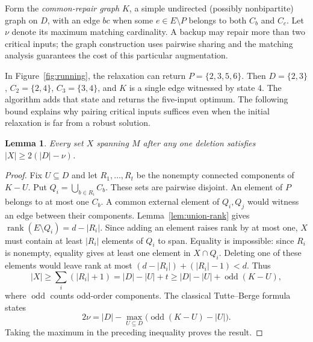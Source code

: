 \documentclass[11pt]{article}
\newtheorem{lemma}[theorem]{Lemma}
\theoremstyle{definition}
\theoremstyle{remark}\newtheorem{remark}[theorem]{Remark}
\DeclareMathOperator{\rk}{rank}
\begin{document}
Form the \emph{common-repair graph} $K$, a simple undirected
(possibly nonbipartite) graph on $D$, with an edge $bc$ when some
$e\in E\setminus P$ belongs to both $C_b$ and $C_c$.
Let $\nu$ denote its maximum matching cardinality. A backup may
repair more than two critical inputs; the graph construction uses
pairwise sharing and the matching analysis guarantees the cost of
this particular augmentation.

In Figure~\ref{fig:running}, the relaxation can return
$P=\{2,3,5,6\}$. Then $D=\{2,3\}$, $C_2=\{2,4\}$,
$C_3=\{3,4\}$, and $K$ is a single edge witnessed by state 4.
The algorithm adds that state and returns the five-input optimum.
The following bound explains why pairing critical inputs suffices
even when the initial relaxation is far from a robust solution.

\begin{lemma}\label{lem:packing}
Every set $X$ spanning $M$ after any one deletion satisfies
$|X|\ge2(|D|-\nu)$.
\end{lemma}
\begin{proof}
Fix $U\subseteq D$ and let $R_1,\ldots,R_t$ be the nonempty connected
components of $K-U$. Put $Q_i=\bigcup_{b\in R_i}C_b$. These sets are
pairwise disjoint. An element of $P$ belongs to at most one $C_b$. A common
external element of $Q_i,Q_j$ would witness an edge between their components.
Lemma~\ref{lem:union-rank} gives $\rk(E\setminus Q_i)=d-|R_i|$.
Since adding an element raises rank by at most one, $X$ must contain at
least $|R_i|$ elements of $Q_i$ to span. Equality is impossible: since $R_i$ is nonempty, equality gives at
least one element in $X\cap Q_i$. Deleting one of these elements would leave rank at most
$(d-|R_i|)+(|R_i|-1)<d$. Thus
\[
 |X|\ge\sum_i(|R_i|+1)=|D|-|U|+t
 \ge |D|-|U|+\operatorname{odd}(K-U),
\]
where $\operatorname{odd}$ counts odd-order components. The classical
Tutte--Berge formula~\cite{LP} states
\[
 2\nu=|D|-\max_{U\subseteq D}
 \bigl(\operatorname{odd}(K-U)-|U|\bigr).
\]
Taking the maximum in the preceding inequality proves the result.
\end{proof}
\end{document}
